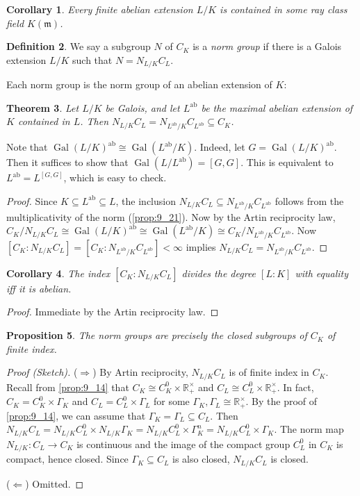 \documentclass[11pt]{article}
\theoremstyle{definition}
\newtheorem{definition}{Definition}[section]
\theoremstyle{plain}
\newtheorem{theorem}[definition]{Theorem}
\newtheorem{proposition}[definition]{Proposition}
\newtheorem{corollary}[definition]{Corollary}
\theoremstyle{remark}
\DeclareMathOperator{\Gal}{Gal}
\newcommand{\RR}{\mathbb{R}}
\newcommand{\fm}{\mathfrak{m}}
\newcommand{\ab}{\mathrm{ab}}
\begin{document}
\begin{corollary}\label{cor:9_25}
    Every finite abelian extension $L/K$ is contained in some ray class field $K(\fm)$.
\end{corollary}

\begin{definition}\label{def:9_26}
    We say a subgroup $N$ of $C_K$ is a \emph{norm group} if there is a Galois extension $L/K$ such that $N = N_{L/K} C_L$.
\end{definition}

Each norm group is the norm group of an abelian extension of $K$:
\begin{theorem}\label{thm:9_27}
    Let $L/K$ be Galois, and let $L^\ab$ be the maximal abelian extension of $K$ contained in $L$. Then $N_{L/K} C_L = N_{L^\ab / K} C_{L^\ab} \subseteq C_K$.
\end{theorem}
{\color{blue}
    Note that $\Gal(L/K)^\ab \cong \Gal(L^\ab/K)$. Indeed, let $G = \Gal(L/K)^\ab$. Then it suffices to show that $\Gal(L/L^\ab) = [G,G]$. This is equivalent to $L^\ab = L^{[G,G]}$, which is easy to check.
}
\begin{proof}
    Since $K \subseteq L^\ab \subseteq L$, the inclusion $N_{L/K} C_L \subseteq N_{L^\ab / K} C_{L^\ab}$ follows from the multiplicativity of the norm (\autoref{prop:9_21}). Now by the Artin reciprocity law, $C_K / N_{L/K} C_L \cong \Gal(L/K)^\ab \cong \Gal(L^\ab / K) \cong C_K / N_{L^\ab / K} C_{L^\ab}$. Now $[C_K : N_{L/K} C_L] = [C_K : N_{L^\ab/K} C_{L^\ab}] < \infty$ implies $N_{L/K} C_L = N_{L^\ab / K} C_{L^\ab}$.
\end{proof}

\begin{corollary}\label{cor:9_28}
    The index $[C_K : N_{L/K} C_L]$ divides the degree $[L:K]$ with equality iff it is abelian.
\end{corollary}
\begin{proof}
    Immediate by the Artin reciprocity law.
\end{proof}

\begin{proposition}\label{prop:9_29}
    The norm groups are precisely the closed subgroups of $C_K$ of finite index.
\end{proposition}
\begin{proof}[Proof (Sketch)]\phantom{}
    ($\Rightarrow$) By Artin reciprocity, $N_{L/K} C_L$ is of finite index in $C_K$. Recall from \autoref{prop:9_14} that $C_K \cong C_K^0 \times \RR_+^\times$ and $C_L \cong C_L^0 \times \RR_+^\times$. In fact, $C_K = C_K^0 \times \Gamma_K$ and $C_L = C_L^0 \times \Gamma_L$ for some $\Gamma_K, \Gamma_L \cong \RR_+^\times$. By the proof of \autoref{prop:9_14}, we can assume that $\Gamma_K = \Gamma_L \subseteq C_L$. Then $N_{L/K} C_L = N_{L/K} C_L^0 \times N_{L/K} \Gamma_K = N_{L/K} C_L^0 \times \Gamma_K^n = N_{L/K} C_L^0 \times \Gamma_K$. The norm map $N_{L/K} : C_L \to C_K$ is continuous and the image of the compact group $C_L^0$ in $C_K$ is compact, hence closed. Since $\Gamma_K \subseteq C_L$ is also closed, $N_{L/K} C_L$ is closed.

    ($\Leftarrow$) Omitted.
\end{proof}
\end{document}
